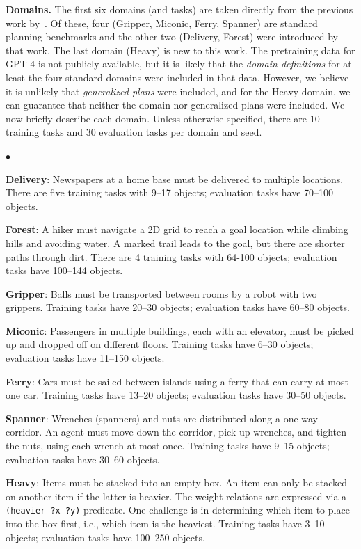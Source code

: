 \documentclass[letterpaper]{article} %
\newenvironment{tightlist}%
{\begin{list}{$\bullet$}{%
\setlength{\topsep}{0in}
\setlength{\partopsep}{0in}
\setlength{\itemsep}{0in}
\setlength{\parsep}{0in}
\setlength{\leftmargin}{1.5em}
\setlength{\rightmargin}{0in}
}
}%
{\end{list}
}
\begin{document}
\textbf{Domains.}
The first six domains (and tasks) are taken directly from the previous work by~\citet{yang2022pg3}.
Of these, four (Gripper, Miconic, Ferry, Spanner) are standard planning benchmarks and the other two (Delivery, Forest) were introduced by that work.
The last domain (Heavy) is new to this work.
The pretraining data for GPT-4 is not publicly available, but it is likely that the \emph{domain definitions} for at least the four standard domains were included in that data.
However, we believe it is unlikely that \emph{generalized plans} were included, and for the Heavy domain, we can guarantee that neither the domain nor generalized plans were included.
We now briefly describe each domain.
Unless otherwise specified, there are 10 training tasks and 30 evaluation tasks per domain and seed.
\begin{tightlist}
\item \textbf{Delivery}: Newspapers at a home base must be delivered to multiple locations. There are five training tasks with 9--17 objects; evaluation tasks have 70--100 objects.
\item \textbf{Forest}: A hiker must navigate a 2D grid to reach a goal location while climbing hills and avoiding water. A marked trail leads to the goal, but there are shorter paths through dirt. There are 4 training tasks with 64-100 objects; evaluation tasks have 100--144 objects.
\item \textbf{Gripper}: Balls must be transported between rooms by a robot with two grippers. Training tasks have 20--30 objects; evaluation tasks have 60--80 objects.
\item \textbf{Miconic}: Passengers in multiple buildings, each with an elevator, must be picked up and dropped off on different floors. Training tasks have 6--30 objects; evaluation tasks have 11--150 objects.
\item \textbf{Ferry}: Cars must be sailed between islands using a ferry that can carry at most one car.
Training tasks have 13--20 objects; evaluation tasks have 30--50 objects.
\item \textbf{Spanner}: Wrenches (spanners) and nuts are distributed along a one-way corridor. An agent must move down the corridor, pick up wrenches, and tighten the nuts, using each wrench at most once.
Training tasks have 9--15 objects; evaluation tasks have 30--60 objects.
\item \textbf{Heavy}: Items must be stacked into an empty box. An item can only be stacked on another item if the latter is heavier. The weight relations are expressed via a \texttt{(heavier ?x ?y)} predicate. One challenge is in determining which item to place into the box first, i.e., which item is the heaviest.
Training tasks have 3--10 objects; evaluation tasks have 100--250 objects.
\end{tightlist}
\end{document}

